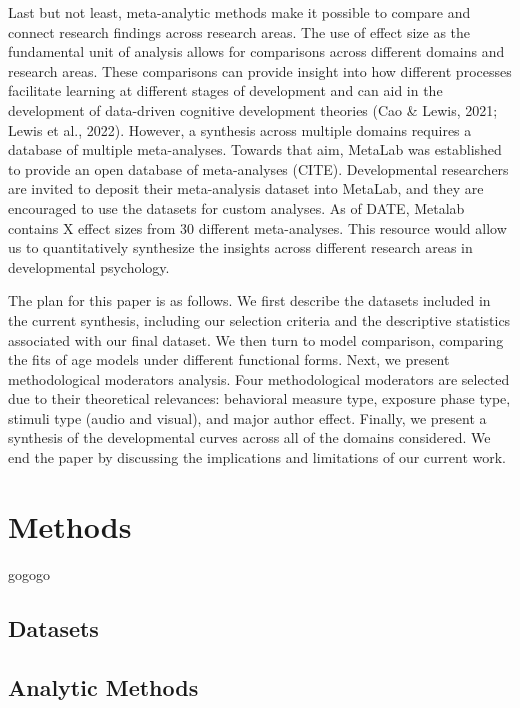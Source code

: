 \documentclass[10pt, letterpaper]{article}
\begin{document}
Last but not least, meta-analytic methods make it possible to compare
and connect research findings across research areas. The use of effect
size as the fundamental unit of analysis allows for comparisons across
different domains and research areas. These comparisons can provide
insight into how different processes facilitate learning at different
stages of development and can aid in the development of data-driven
cognitive development theories (Cao \& Lewis, 2021; Lewis et al., 2022).
However, a synthesis across multiple domains requires a database of
multiple meta-analyses. Towards that aim, MetaLab was established to
provide an open database of meta-analyses (CITE). Developmental
researchers are invited to deposit their meta-analysis dataset into
MetaLab, and they are encouraged to use the datasets for custom
analyses. As of DATE, Metalab contains X effect sizes from 30 different
meta-analyses. This resource would allow us to quantitatively synthesize
the insights across different research areas in developmental
psychology.

The plan for this paper is as follows. We first describe the datasets
included in the current synthesis, including our selection criteria and
the descriptive statistics associated with our final dataset. We then
turn to model comparison, comparing the fits of age models under
different functional forms. Next, we present methodological moderators
analysis. Four methodological moderators are selected due to their
theoretical relevances: behavioral measure type, exposure phase type,
stimuli type (audio and visual), and major author effect. Finally, we
present a synthesis of the developmental curves across all of the
domains considered. We end the paper by discussing the implications and
limitations of our current work.

\hypertarget{methods}{%
\section{Methods}\label{methods}}

gogogo

\hypertarget{datasets}{%
\subsection{Datasets}\label{datasets}}

\hypertarget{analytic-methods}{%
\subsection{Analytic Methods}\label{analytic-methods}}
\end{document}
